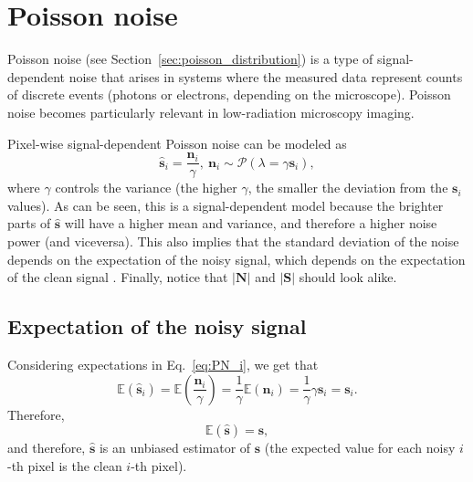 \section{Poisson noise}

Poisson noise (see Section~\ref{sec:poisson_distribution}) is a type
of signal-dependent noise that arises in systems where the measured
data represent counts of discrete events (photons or electrons,
depending on the microscope). Poisson noise becomes particularly
relevant in low-radiation microscopy imaging.

Pixel-wise signal-dependent Poisson noise can be modeled as
\begin{equation}
  \hat{\mathbf{s}}_i = \frac{\mathbf{n}_i}{\gamma},~\mathbf{n}_i\sim\mathcal{P}(\lambda=\gamma\mathbf{s}_i),
  \label{eq:PN_i}
\end{equation}
where $\gamma$ controls the variance (the higher $\gamma$, the smaller
the deviation from the $\mathbf{s}_i$ values). As can be seen, this is
a signal-dependent model because the brighter parts of
$\hat{\mathbf s}$ will have a higher mean and variance, and therefore
a higher noise power \cite{meiniel2018denoising} (and viceversa). This also implies
that the standard deviation of the noise depends on the expectation of
the noisy signal, which depends on the expectation of the clean signal
\cite{foi2008practical}. Finally, notice that $|\mathbf{N}|$ and
$|\mathbf{S}|$ should look alike.

\subsection{Expectation of the noisy signal}
Considering expectations in Eq.~\ref{eq:PN_i}, we get that
\begin{equation}
  \mathbb{E}(\hat{\mathbf{s}}_i) = \mathbb{E}\left(\frac{\mathbf{n}_i}{\gamma}\right) = \frac{1}{\gamma}\mathbb{E}(\mathbf{n}_i) = \frac{1}{\gamma}\gamma\mathbf{s}_i = \mathbf{s}_i.
  \label{eq:EPNi}
\end{equation}
Therefore,
\begin{equation}
  \mathbb{E}(\hat{\mathbf{s}}) = \mathbf{s},
  \label{eq:E_Poisson}
\end{equation}
and therefore, $\hat{\mathbf{s}}$ is an unbiased estimator of
$\mathbf{s}$ (the expected value for each noisy $i$-th pixel is the
clean $i$-th pixel).

